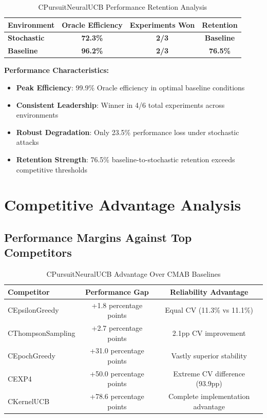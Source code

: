 \documentclass[12pt,a4paper]{article}
\newcommand{\primarytext}[1]{\textcolor{primaryblue}{\textbf{#1}}}
\newcommand{\secondarytext}[1]{\textcolor{secondaryblue}{\textbf{#1}}}
\newcommand{\success}[1]{\textcolor{accentgreen}{\textbf{#1}}}
\begin{document}
\begin{table}[H]
\centering
\caption{CPursuitNeuralUCB Performance Retention Analysis}
\begin{tabular}{@{}lccc@{}}
\toprule
\textbf{Environment} & \textbf{Oracle Efficiency} & \textbf{Experiments Won} & \textbf{Retention} \\
\midrule
\success{Stochastic} & \success{72.3\%} & \success{2/3} & \success{Baseline} \\
\success{Baseline} & \success{96.2\%} & \success{2/3} & \success{76.5\%} \\
\bottomrule
\end{tabular}
\end{table}

\textbf{Performance Characteristics:}
\begin{itemize}
\item \success{Peak Efficiency}: 99.9\% Oracle efficiency in optimal baseline conditions
\item \primarytext{Consistent Leadership}: Winner in 4/6 total experiments across environments
\item \secondarytext{Robust Degradation}: Only 23.5\% performance loss under stochastic attacks
\item \success{Retention Strength}: 76.5\% baseline-to-stochastic retention exceeds competitive thresholds
\end{itemize}

\section{Competitive Advantage Analysis}

\subsection{Performance Margins Against Top Competitors}

\begin{table}[H]
\centering
\caption{CPursuitNeuralUCB Advantage Over CMAB Baselines}
\begin{tabular}{@{}lcc@{}}
\toprule
\textbf{Competitor} & \textbf{Performance Gap} & \textbf{Reliability Advantage} \\
\midrule
CEpsilonGreedy & +1.8 percentage points & Equal CV (11.3\% vs 11.1\%) \\
CThompsonSampling & +2.7 percentage points & 2.1pp CV improvement \\
CEpochGreedy & +31.0 percentage points & Vastly superior stability \\
CEXP4 & +50.0 percentage points & Extreme CV difference (93.9pp) \\
CKernelUCB & +78.6 percentage points & Complete implementation advantage \\
\bottomrule
\end{tabular}
\end{table}
\end{document}
